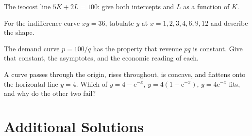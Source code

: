 \begin{problems}
  \item The isocost line $5K+2L=100$: give both intercepts and $L$ as a
        function of $K$.
  \item For the indifference curve $xy=36$, tabulate $y$ at
        $x=1,2,3,4,6,9,12$ and describe the shape.
  \item The demand curve $p=100/q$ has the property that revenue $pq$ is
        constant. Give that constant, the asymptotes, and the economic
        reading of each.
  \item A curve passes through the origin, rises throughout, is concave,
        and flattens onto the horizontal line $y=4$. Which of
        $y=4-\mathrm{e}^{-x}$, \;$y=4(1-\mathrm{e}^{-x})$,
        \;$y=4\mathrm{e}^{-x}$ fits, and why do the other two fail?
\end{problems}

\section{Additional Solutions}

